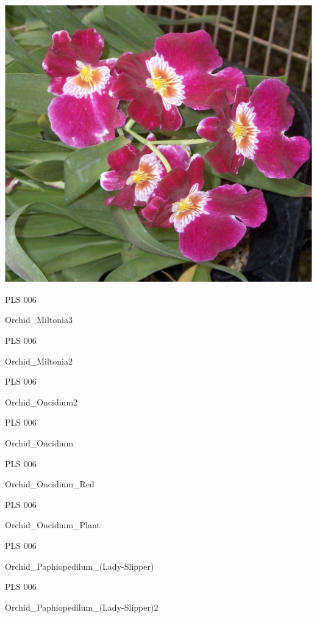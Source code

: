 \documentclass{article}
\begin{document}
\begin{center}
\includegraphics[height=0.925\paperheight]{../Orchid_Miltonia.jpg}
\end{center}
\newpage

\noindent  PLS 006
\vfill
\centerline{{\huge Orchid\_Miltonia3 }}
\vfill
\newpage

\noindent  PLS 006
\vfill
\centerline{{\huge Orchid\_Miltonia2 }}
\vfill
\newpage

\noindent  PLS 006
\vfill
\centerline{{\huge Orchid\_Oncidium2 }}
\vfill
\newpage

\noindent  PLS 006
\vfill
\centerline{{\huge Orchid\_Oncidium }}
\vfill
\newpage

\noindent  PLS 006
\vfill
\centerline{{\huge Orchid\_Oncidium\_Red }}
\vfill
\newpage

\noindent  PLS 006
\vfill
\centerline{{\huge Orchid\_Oncidium\_Plant }}
\vfill
\newpage

\noindent  PLS 006
\vfill
\centerline{{\huge Orchid\_Paphiopedilum\_(Lady-Slipper) }}
\vfill
\newpage

\noindent  PLS 006
\vfill
\centerline{{\huge Orchid\_Paphiopedilum\_(Lady-Slipper)2 }}
\vfill
\newpage
\end{document}
